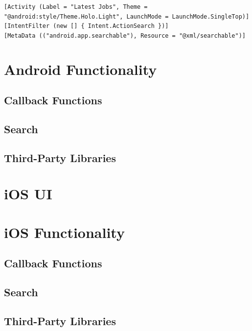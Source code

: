 \begin{lstlisting}[frame=lt,caption=MainActivity.cs, label={list:main_ac}]
[Activity (Label = "Latest Jobs", Theme = "@android:style/Theme.Holo.Light", LaunchMode = LaunchMode.SingleTop)]
[IntentFilter (new [] { Intent.ActionSearch })]
[MetaData (("android.app.searchable"), Resource = "@xml/searchable")]
\end{lstlisting}
   





\section{Android Functionality}

\subsection{Callback Functions}\label{callback:and}

\subsection{Search}

\subsection{Third-Party Libraries}



\section{iOS UI}


\section{iOS Functionality}

\subsection{Callback Functions}\label{callback:ios}

\subsection{Search}

\subsection{Third-Party Libraries}